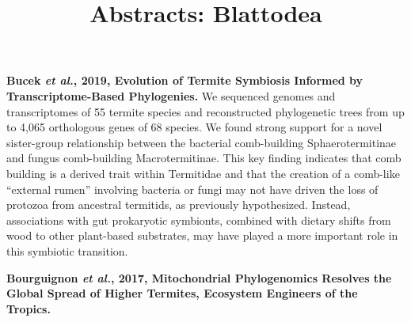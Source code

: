 \documentclass[11pt]{article}
\title{Abstracts: Blattodea}
\author{}
\date{}
\begin{document}
\begin{sloppypar}
  \maketitle

  \linenumbers
\textbf{Bucek \textit{et al.}, 2019, Evolution of Termite Symbiosis Informed by Transcriptome-Based Phylogenies.} \newline
We sequenced genomes and transcriptomes of 55 termite species and reconstructed phylogenetic trees from up to 4,065 orthologous genes of 68 species. 
We found strong support for a novel sister-group relationship between the bacterial comb-building Sphaerotermitinae and fungus comb-building Macrotermitinae. 
This key finding indicates that comb building is a derived trait within Termitidae and that the creation of a comb-like “external rumen” involving bacteria or fungi may not have driven the loss of protozoa from ancestral termitids, as previously hypothesized. 
Instead, associations with gut prokaryotic symbionts, combined with dietary shifts from wood to other plant-based substrates, may have played a more important role in this symbiotic transition. 
\par
\textbf{Bourguignon \textit{et al.}, 2017, Mitochondrial Phylogenomics Resolves the Global Spread of Higher Termites, Ecosystem Engineers of the Tropics.} \newline

\par


\end{sloppypar}
\end{document}
